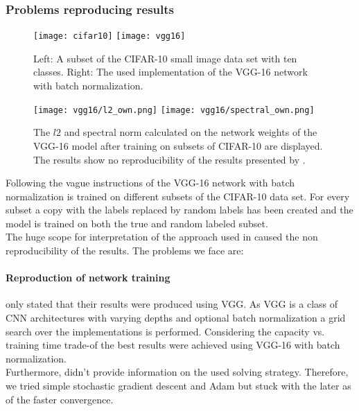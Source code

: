 \subsubsection{Problems reproducing results}
\begin{figure}
	\centering
	\texttt{[image: cifar10]}
	\texttt{[image: vgg16]}
	\caption{Left: A subset of the CIFAR-10 small image data set with ten classes. Right: The used implementation of the VGG-16 network with batch normalization.}	
	\label{fig:cifar-vgg}
\end{figure}
\begin{figure}
	\centering
	\texttt{[image: vgg16/l2\_own.png]}
	\texttt{[image: vgg16/spectral\_own.png]}
	\caption{The $l2$ and spectral norm calculated on the network weights of the VGG-16 model after training on subsets of CIFAR-10 are displayed. The results show no reproducibility of the results presented by \cite{neyshabur2017exploring}.}	
	\label{fig:norms-own}
\end{figure}
Following the vague instructions of \cite{neyshabur2017exploring} the VGG-16 network with batch normalization  is trained on different subsets of the CIFAR-10  data set. For every subset a copy with the labels replaced by random labels has been created and the model is trained on both the true and random labeled subset. \\
%
The huge scope for interpretation of the approach used in \cite{neyshabur2017exploring} caused the non reproducibility of the results. The problems we face are:
%
\paragraph{Reproduction of network training}
\ns{} only stated that their results were produced using VGG. As VGG is a class of CNN architectures with varying depths and optional batch normalization a grid search over the implementations is performed. Considering the capacity vs. training time trade-of the best results were achieved using VGG-16 with batch normalization.\\
Furthermore, \cite{neyshabur2017exploring} didn't provide information on the used solving strategy. Therefore, we tried simple stochastic gradient descent and Adam but stuck with the later as of the faster convergence.
%

